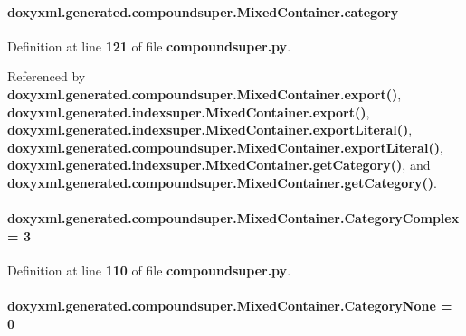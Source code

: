 \paragraph[{category}]{\setlength{\rightskip}{0pt plus 5cm}doxyxml.\+generated.\+compoundsuper.\+Mixed\+Container.\+category}\label{classdoxyxml_1_1generated_1_1compoundsuper_1_1MixedContainer_af1aa4282250d68dce70aaa4d41f1f9b4}


Definition at line {\bf 121} of file {\bf compoundsuper.\+py}.



Referenced by {\bf doxyxml.\+generated.\+compoundsuper.\+Mixed\+Container.\+export()}, {\bf doxyxml.\+generated.\+indexsuper.\+Mixed\+Container.\+export()}, {\bf doxyxml.\+generated.\+indexsuper.\+Mixed\+Container.\+export\+Literal()}, {\bf doxyxml.\+generated.\+compoundsuper.\+Mixed\+Container.\+export\+Literal()}, {\bf doxyxml.\+generated.\+indexsuper.\+Mixed\+Container.\+get\+Category()}, and {\bf doxyxml.\+generated.\+compoundsuper.\+Mixed\+Container.\+get\+Category()}.

\paragraph[{Category\+Complex}]{ doxyxml.\+generated.\+compoundsuper.\+Mixed\+Container.\+Category\+Complex = 3\hspace{0.3cm}{\ttfamily [static]}}\label{classdoxyxml_1_1generated_1_1compoundsuper_1_1MixedContainer_a1a221f63a2fddc9c249c23387d456b88}


Definition at line {\bf 110} of file {\bf compoundsuper.\+py}.

\paragraph[{Category\+None}]{ doxyxml.\+generated.\+compoundsuper.\+Mixed\+Container.\+Category\+None = 0\hspace{0.3cm}{\ttfamily [static]}}\label{classdoxyxml_1_1generated_1_1compoundsuper_1_1MixedContainer_afdd3554955862b6649b4fb553b1ab71e}


